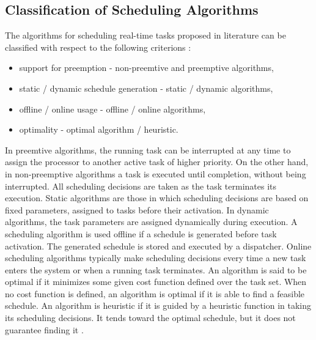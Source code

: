 \subsection{Classification of Scheduling Algorithms}
The algorithms for scheduling real-time tasks proposed in literature can be classified with respect to the following criterions \cite{buttazzo2011hard}:
\begin{itemize}
    \item support for preemption - non-preemtive and preemptive algorithms, 
    \item static / dynamic schedule generation - static / dynamic algorithms,
    \item offline / online usage - offline / online algorithms,
    \item optimality - optimal algorithm / heuristic.
\end{itemize}
In preemtive algorithms, the running task can be interrupted at any time to assign the processor to another active task of higher priority.
On the other hand, in non-preemptive algorithms a task is executed until completion, without being interrupted. 
All scheduling decisions are taken as the task terminates its execution.
Static algorithms are those in which scheduling decisions are based on fixed parameters, assigned to tasks before their activation.
In dynamic algorithms, the task parameters are assigned dynamically during execution.
A scheduling algorithm is used offline if a schedule is generated before task activation. 
The generated schedule is stored and executed by a dispatcher.
Online scheduling algorithms typically make scheduling decisions every time a new task enters the system or when a running task terminates.
An algorithm is said to be optimal if it minimizes some given cost function defined over the task set. 
When no cost function is defined, an algorithm is optimal if it is able to find a feasible schedule.
An algorithm is heuristic if it is guided by a heuristic function in taking its scheduling decisions. 
It tends toward the optimal schedule, but it does not guarantee finding it \cite{buttazzo2011hard}.

